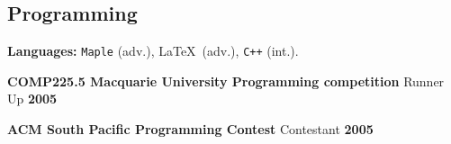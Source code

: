 \documentclass[margin,line]{resume}
\newcommand{\award}[3]{\textbf{#1} #2 \hfill \textbf{#3}
           
\vspace{-2.3mm}}
\begin{document}
\begin{resume}
\vspace{2mm}






%   
%    
% 






    \section{\mysidestyle Programming} 
\award{Languages:}{\texttt{Maple} (adv.), \LaTeX\ (adv.), \texttt{C++} (int.).}{}
\award{COMP225.5 Macquarie University Programming competition}{Runner Up}{2005}
\award{ACM South Pacific Programming Contest}{Contestant}{2005}
%




%
%


\end{resume}
\end{document}
